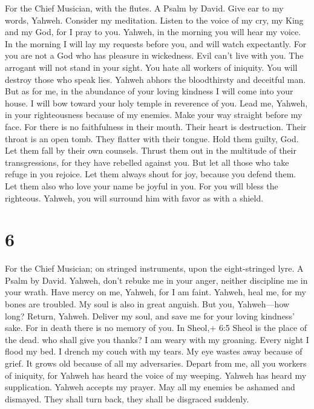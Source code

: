 For the Chief Musician, with the flutes. A Psalm by David. 
Give ear to my words, Yahweh. Consider my meditation. 
Listen to the voice of my cry, my King and my God, for I pray to you.
 Yahweh, in the morning you will hear my voice. In the
morning I will lay my requests before you, and will watch expectantly.
 For you are not a God who has pleasure in wickedness. Evil
can't live with you.  The arrogant will not stand in your
sight. You hate all workers of iniquity.  You will destroy
those who speak lies. Yahweh abhors the bloodthirsty and deceitful man.
 But as for me, in the abundance of your loving kindness I
will come into your house. I will bow toward your holy temple in
reverence of you.  Lead me, Yahweh, in your righteousness
because of my enemies. Make your way straight before my face.
 For there is no faithfulness in their mouth. Their heart is
destruction. Their throat is an open tomb. They flatter with their
tongue.  Hold them guilty, God. Let them fall by their own
counsels. Thrust them out in the multitude of their transgressions, for
they have rebelled against you.  But let all those who take
refuge in you rejoice. Let them always shout for joy, because you defend
them. Let them also who love your name be joyful in you. 
For you will bless the righteous. Yahweh, you will surround him with
favor as with a shield.

\hypertarget{section-5}{%
\section{6}\label{section-5}}

For the Chief Musician; on stringed instruments, upon the eight-stringed
lyre. A Psalm by David.  Yahweh, don't rebuke me in your
anger, neither discipline me in your wrath.  Have mercy on
me, Yahweh, for I am faint. Yahweh, heal me, for my bones are troubled.
 My soul is also in great anguish. But you, Yahweh---how
long?  Return, Yahweh. Deliver my soul, and save me for your
loving kindness' sake.  For in death there is no memory of
you. In Sheol,+ 6:5 Sheol is the place of the dead. who shall give you
thanks?  I am weary with my groaning. Every night I flood my
bed. I drench my couch with my tears.  My eye wastes away
because of grief. It grows old because of all my adversaries.
 Depart from me, all you workers of iniquity, for Yahweh has
heard the voice of my weeping.  Yahweh has heard my
supplication. Yahweh accepts my prayer.  May all my enemies
be ashamed and dismayed. They shall turn back, they shall be disgraced
suddenly.

